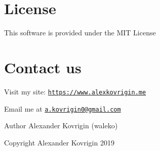 \hypertarget{index_license}{}\section{License}\label{index_license}
This software is provided under the M\+IT License\hypertarget{index_contact}{}\section{Contact us}\label{index_contact}
Visit my site\+: \href{https://www.alexkovrigin.me}{\tt https\+://www.\+alexkovrigin.\+me}

Email me at \href{mailto:a.kovrigin0@gmail.com}{\tt a.\+kovrigin0@gmail.\+com}

\begin{DoxyAuthor}{Author}
Alexander Kovrigin (waleko) 
\end{DoxyAuthor}
\begin{DoxyCopyright}{Copyright}
Alexander Kovrigin 2019  
\end{DoxyCopyright}
